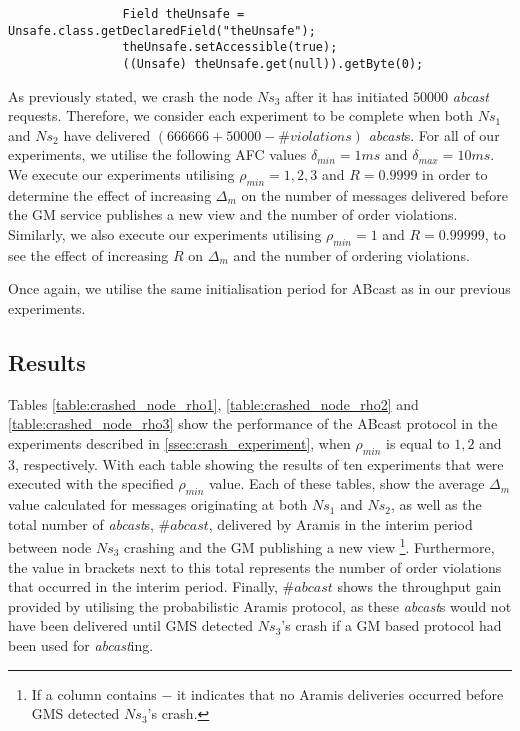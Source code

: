     \noindent
    \begin{minipage}{\linewidth}
        \hfill
	    \begin{lstlisting}
	            Field theUnsafe = Unsafe.class.getDeclaredField("theUnsafe");
	            theUnsafe.setAccessible(true);
	            ((Unsafe) theUnsafe.get(null)).getByte(0);
	    \end{lstlisting}
	    \hfill
	\end{minipage}

    As previously stated, we crash the node $Ns_3$ after it has initiated $50000$ \emph{abcast} requests.  Therefore, we consider each experiment to be complete when both $Ns_1$ and $Ns_2$ have delivered $(666666 + 50000 - \#violations)$ \emph{abcast}s.  For all of our experiments, we utilise the following AFC values $\delta_{min} = 1ms$ and $\delta_{max} = 10ms$.  We execute our experiments utilising $\rho_{min} = 1,2,3$ and $R=0.9999$ in order to determine the effect of increasing $\Delta_m$ on the number of messages delivered before the GM service publishes a new view and the number of order violations.  Similarly, we also execute our experiments utilising $\rho_{min} = 1$ and $R=0.99999$, to see the effect of increasing $R$ on $\Delta_m$ and the number of ordering violations.  
    
    Once again, we utilise the same initialisation period for \textsf{ABcast} as in our previous experiments.  
    
    \subsection{Results}
    Tables \ref{table:crashed_node_rho1}, \ref{table:crashed_node_rho2} and \ref{table:crashed_node_rho3} show the performance of the \textsf{ABcast} protocol in the experiments described in \ref{ssec:crash_experiment}, when $\rho_{min}$ is equal to $1, 2$ and $3$, respectively.  With each table showing the results of ten experiments that were executed with the specified $\rho_{min}$ value.  Each of these tables, show the average $\Delta_m$ value calculated for messages originating at both $Ns_1$ and $Ns_2$, as well as the total number of \emph{abcast}s, $\#abcast$, delivered by \textsf{Aramis} in the interim period between node $Ns_3$ crashing and the GM publishing a new view \footnote{If a column contains $-$ it indicates that no \textsf{Aramis} deliveries occurred before GMS detected $Ns_3$'s crash.}.  Furthermore, the value in brackets next to this total represents the number of order violations that occurred in the interim period.  Finally, $\#abcast$ shows the throughput gain provided by utilising the probabilistic \textsf{Aramis} protocol, as these \emph{abcast}s would not have been delivered until GMS detected $Ns_3$'s crash if a GM based protocol had been used for \emph{abcast}ing.   

